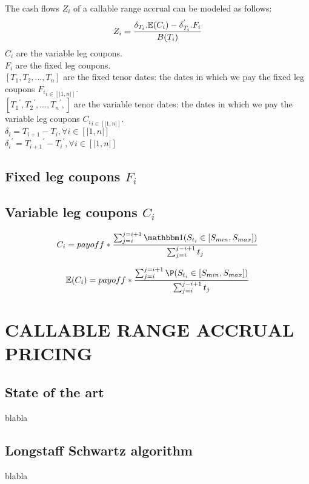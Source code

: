 \documentclass[letterpaper, 10 pt, conference]{IEEEtran}
\begin{document}
				The cash flows $Z_{i}$ of a callable range accrual can be modeled as follows:
				\begin{equation}
					Z_i=\frac{\delta_{T_i} . \mathbb{E}(C_i)-\delta_{T_i}^{'} . F_i}{B(T_i)}
				\end{equation}
				$C_{i}$ are the variable leg coupons.\\
				$F_{i}$ are the fixed leg coupons.\\
				$[T_{1}, T_{2},..., T_{n}]$ are the fixed tenor dates: the dates in which we pay the fixed leg coupons ${F_{i}}_{i \in [|1,n|]}$.\\
				$[{T_{1}}^{'}, {T_{2}}^{'},..., {T_{n}}^{'},]$ are the variable tenor dates: the dates in which we pay the variable leg coupons ${C_{i}}_{i \in [|1,n|]}$.\\
				${\delta}_{i} = T_{i+1} - T_{i},  \forall i \in [|1,n|]$\\
				${{\delta}_{i}}^{'} = {T_{i+1}}^{'} - {T_{i}}^{'},  \forall i \in [|1,n|]$\\

				\subsection{Fixed leg coupons $F_{i}$}
				\subsection{Variable leg coupons $C_{i}$}
					\begin{equation*}
						C_i=payoff * \frac{\sum_{j=i}^{j=i+1}\indicator (S_{t_i} \in [S_{min},S_{max}])}{\sum_{j=i}^{j-i+1}t_j}
					\end{equation*}
					
					\begin{equation*}
					\E(C_i)=payoff * \frac{\sum_{j=i}^{j=i+1} \P (S_{t_i} \in [S_{min},S_{max}])}{\sum_{j=i}^{j-i+1}t_j}
					\end{equation*}
					
						
	
	
	\section{CALLABLE RANGE ACCRUAL PRICING}
	\subsection{State of the art}
	blabla
	\subsection{Longstaff Schwartz algorithm}
	blabla
\end{document}

